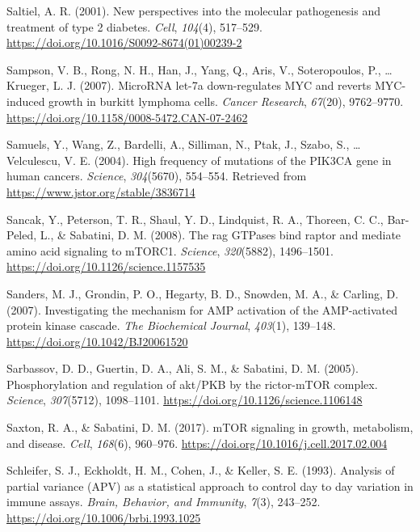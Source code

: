 \documentclass[12pt,openany]{book}
\begin{document}
\hypertarget{ref-Saltiel2001}{}
Saltiel, A. R. (2001). New perspectives into the molecular pathogenesis
and treatment of type 2 diabetes. \emph{Cell}, \emph{104}(4), 517--529.
\url{https://doi.org/10.1016/S0092-8674(01)00239-2}

\hypertarget{ref-Sampson2007}{}
Sampson, V. B., Rong, N. H., Han, J., Yang, Q., Aris, V., Soteropoulos,
P., \ldots{} Krueger, L. J. (2007). MicroRNA let-7a down-regulates MYC
and reverts MYC-induced growth in burkitt lymphoma cells. \emph{Cancer
Research}, \emph{67}(20), 9762--9770.
\url{https://doi.org/10.1158/0008-5472.CAN-07-2462}

\hypertarget{ref-Samuels2004}{}
Samuels, Y., Wang, Z., Bardelli, A., Silliman, N., Ptak, J., Szabo, S.,
\ldots{} Velculescu, V. E. (2004). High frequency of mutations of the
PIK3CA gene in human cancers. \emph{Science}, \emph{304}(5670),
554--554. Retrieved from \url{https://www.jstor.org/stable/3836714}

\hypertarget{ref-Sancak2008}{}
Sancak, Y., Peterson, T. R., Shaul, Y. D., Lindquist, R. A., Thoreen, C.
C., Bar-Peled, L., \& Sabatini, D. M. (2008). The rag GTPases bind
raptor and mediate amino acid signaling to mTORC1. \emph{Science},
\emph{320}(5882), 1496--1501.
\url{https://doi.org/10.1126/science.1157535}

\hypertarget{ref-Sanders2007}{}
Sanders, M. J., Grondin, P. O., Hegarty, B. D., Snowden, M. A., \&
Carling, D. (2007). Investigating the mechanism for AMP activation of
the AMP-activated protein kinase cascade. \emph{The Biochemical
Journal}, \emph{403}(1), 139--148.
\url{https://doi.org/10.1042/BJ20061520}

\hypertarget{ref-Sarbassov2005}{}
Sarbassov, D. D., Guertin, D. A., Ali, S. M., \& Sabatini, D. M. (2005).
Phosphorylation and regulation of akt/PKB by the rictor-mTOR complex.
\emph{Science}, \emph{307}(5712), 1098--1101.
\url{https://doi.org/10.1126/science.1106148}

\hypertarget{ref-Saxton2017}{}
Saxton, R. A., \& Sabatini, D. M. (2017). mTOR signaling in growth,
metabolism, and disease. \emph{Cell}, \emph{168}(6), 960--976.
\url{https://doi.org/10.1016/j.cell.2017.02.004}

\hypertarget{ref-Schleifer1993}{}
Schleifer, S. J., Eckholdt, H. M., Cohen, J., \& Keller, S. E. (1993).
Analysis of partial variance (APV) as a statistical approach to control
day to day variation in immune assays. \emph{Brain, Behavior, and
Immunity}, \emph{7}(3), 243--252.
\url{https://doi.org/10.1006/brbi.1993.1025}
\end{document}
